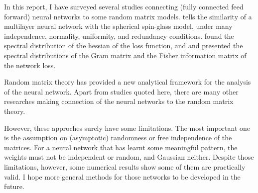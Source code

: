 \documentclass[notitlepage]{report}
\begin{document}
In this report, I have surveyed several studies connecting (fully connected feed forward) neural networks to some random matrix models. \cite{choromanska} tells the similarity of a multilayer neural network with the spherical spin-glass model, under many independence, normality, uniformity, and redundancy conditions. \cite{pennington-bahri} found the spectral distribution of the hessian of the loss function, and \cite{pennington-worah1} and \cite{pennington-worah2} presented the spectral distributions of the Gram matrix and the Fisher information matrix of the network loss.

Random matrix theory has provided a new analytical framework for the analysis of the neural network. Apart from studies quoted here, there are many other researches making connection of the neural networks to the random matrix theory.

However, these approches surely have some limitations. The most important one is the assumption on (asymptotic) randomness or free independence of the matrices. For a neural network that has learnt some meaningful pattern, the weights must not be independent or random, and Gaussian neither. Despite those limitations, however, some numerical results show some of them are practically valid. I hope more general methods for those networks to be developed in the future.



\nocite{*}

\printbibliography[title={References}]
\end{document}
